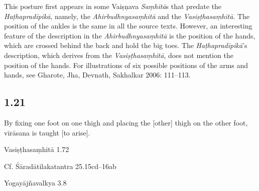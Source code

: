 \begin{ekdosis}
\begin{philcomm}[hp01_020]        
This posture first appears in some Vaiṣṇava \emph{Saṃhitā}s that predate the \emph{Haṭhapradīpikā}, namely, the \emph{Ahirbudhnyasaṃhitā} and the \emph{Vasiṣṭhasaṃhitā}. The position of the ankles is the same in all the source texts. However, an interesting feature of the description in the \emph{Ahirbudhnyasaṃhitā} is the position of the hands, which are crossed behind the back and hold the big toes. The \emph{Haṭhapradīpikā}’s description, which derives from the \emph{Vasiṣṭhasaṃhitā}, does not mention the position of the hands. For illustrations of six possible positions of the arms and hands, see Gharote, Jha, Devnath, Sakhalkar 2006: 111–113.
\end{philcomm}

\subsection*{1.21}
\begin{translation}[hp01_021]
By fixing one foot on one thigh and placing the [other] thigh on the other foot, vīrāsana is taught [to arise].
\end{translation}

\begin{sources}[hp01_021]
Vasiṣṭhasaṃhitā 1.72

\begin{versinnote}
\end{versinnote}

Cf. Śāradātilakatantra 25.15cd–16ab

\begin{versinnote}
\end{versinnote}

Yogayājñavalkya 3.8

\begin{versinnote}
\end{versinnote}

\end{sources}


\end{ekdosis}
